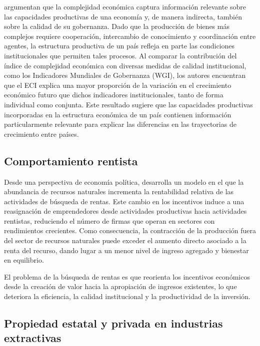 \documentclass[../../PTFM.tex]{subfiles}
\begin{document}
	\textcite{Hausmann2014} argumentan que la complejidad económica captura información relevante sobre las capacidades productivas de una economía y, de manera indirecta, también sobre la calidad de su gobernanza. Dado que la producción de bienes más complejos requiere cooperación, intercambio de conocimiento y coordinación entre agentes, la estructura productiva de un país refleja en parte las condiciones institucionales que permiten tales procesos. Al comparar la contribución del índice de complejidad económica con diversas medidas de calidad institucional, como los Indicadores Mundiales de Gobernanza (WGI), los autores encuentran que el ECI explica una mayor proporción de la variación en el crecimiento económico futuro que dichos indicadores institucionales, tanto de forma individual como conjunta. Este resultado sugiere que las capacidades productivas incorporadas en la estructura económica de un país contienen información particularmente relevante para explicar las diferencias en las trayectorias de crecimiento entre países.
	
	\subsection{Comportamiento rentista}
	\label{subsec:comportamiento-rentista}
	
	Desde una perspectiva de economía política, \textcite{Torvik2001} desarrolla un modelo en el que la abundancia de recursos naturales incrementa la rentabilidad relativa de las actividades de búsqueda de rentas. Este cambio en los incentivos induce a una reasignación de emprendedores desde actividades productivas hacia actividades rentistas, reduciendo el número de firmas que operan en sectores con rendimientos crecientes. Como consecuencia, la contracción de la producción fuera del sector de recursos naturales puede exceder el aumento directo asociado a la renta del recurso, dando lugar a un menor nivel de ingreso agregado y bienestar en equilibrio.
	
	El problema de la búsqueda de rentas es que reorienta los incentivos económicos desde la creación de valor hacia la apropiación de ingresos existentes, lo que deteriora la eficiencia, la calidad institucional y la productividad de la inversión.
	
	\subsection{Propiedad estatal y privada en industrias extractivas}
	\label{subsec:propiedad-estatal-privada}
	
\end{document}
